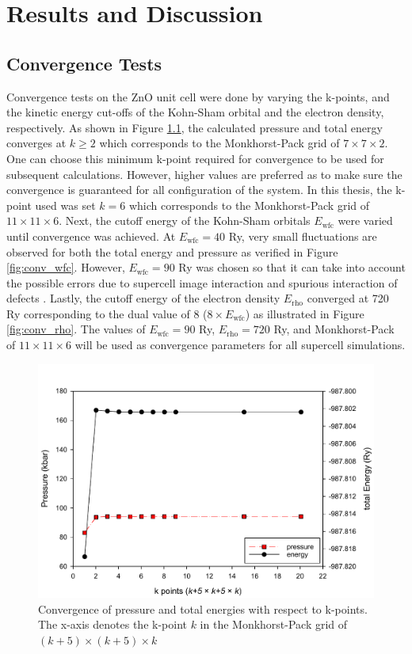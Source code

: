 \chapter{Results and Discussion} \label{chap:rnd}
\section{Convergence Tests}
Convergence tests on the ZnO unit cell were done by varying the k-points, and the kinetic energy cut-offs  of the Kohn-Sham orbital and the electron density, respectively.  As shown in Figure \ref{fig:conv_k}, the calculated pressure and total energy converges at $k \geq 2$ which corresponds to the Monkhorst-Pack grid of $7 \times 7 \times 2$. One can choose this minimum k-point required for convergence to be used for subsequent calculations. However, higher values are preferred as to make sure the convergence is guaranteed for all configuration of the system. In this thesis, the k-point used was set $k = 6$ which corresponds to the Monkhorst-Pack grid of $11 \times 11 \times 6$. Next, the cutoff energy of the Kohn-Sham orbitals $E_{\text{wfc}}$ were varied until convergence was achieved. At $E_{\text{wfc}} = 40$ Ry, very small fluctuations are observed for both the total energy and pressure as verified in Figure \ref{fig:conv_wfc}. However, $E_{\text{wfc}} = 90$ Ry was chosen so that it can take into account the possible errors due to supercell image interaction and spurious interaction of defects \citep{White1994,Makov1995,Martyna1999}. Lastly, the cutoff energy of the electron density $E_{\text{rho}}$ converged at 720 Ry corresponding to the dual value of 8 ($8 \times E_{\text{wfc}}$) as illustrated in Figure \ref{fig:conv_rho}. The values of $E_{\text{wfc}} = 90$ Ry, $E_{\text{rho}} = 720$ Ry, and Monkhorst-Pack of $11 \times 11 \times 6$ will be used as convergence parameters for all supercell simulations. 

\begin{figure}[tbh!] 
	\centering
	\includegraphics[width=0.7\linewidth]{"images/rnd/kpoints"}
	\caption[Convergence of pressure and total energies with respect to k-points]{Convergence of pressure and total energies with respect to k-points. The x-axis denotes the k-point $k$ in the Monkhorst-Pack grid of $(k+5) \times (k +5 ) \times k$}
	\label{fig:conv_k}
\end{figure}

